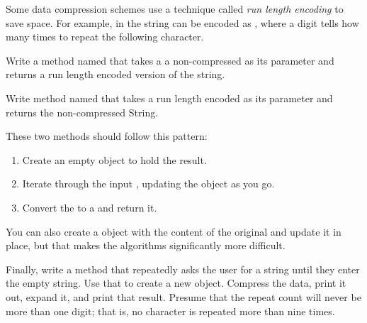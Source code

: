 \begin{exercise}
Some data compression schemes use a technique called {\em run length encoding} to save space. For example, in the string  can be encoded as , where a digit tells how many times to repeat the following character.

Write a method named  that takes a a non-compressed  as its parameter and returns a run length encoded version of the string.

Write method named  that takes a run length encoded  as its parameter and returns the non-compressed String.

These two methods should follow this pattern:

\begin{enumerate}
\item Create an empty  object to hold the result.
\item Iterate through the input , updating the  object as you go.
\item Convert the  to a  and return it.
\end{enumerate}

You can also create a  object with the content of the original  and update it in place, but that makes the algorithms significantly more difficult.

Finally, write a  method that repeatedly asks the user for a string until they enter the empty string. Use that  to create a new  object.  Compress the data, print it out, expand it, and print that result. Presume that the repeat count will never be more than one digit; that is, no character is repeated more than nine times.





\end{exercise}
